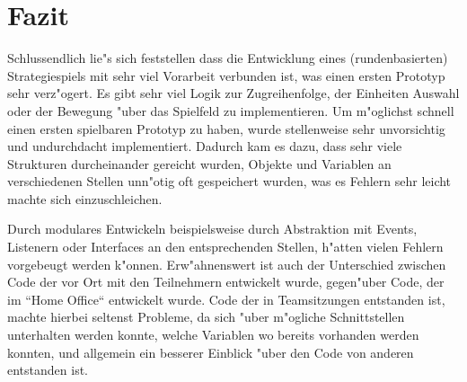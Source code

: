 \chapter{Fazit}
Schlussendlich lie"s sich feststellen dass die Entwicklung eines (rundenbasierten) Strategiespiels mit sehr viel Vorarbeit verbunden ist, was einen ersten Prototyp sehr verz"ogert. Es gibt sehr viel Logik zur Zugreihenfolge, der Einheiten Auswahl oder der Bewegung "uber das Spielfeld zu implementieren. Um m"oglichst schnell einen ersten spielbaren Prototyp zu haben, wurde stellenweise sehr unvorsichtig und undurchdacht implementiert. Dadurch kam es dazu, dass sehr viele Strukturen durcheinander gereicht wurden, Objekte und Variablen an verschiedenen Stellen unn"otig oft gespeichert wurden, was es Fehlern sehr leicht machte sich einzuschleichen.

Durch modulares Entwickeln beispielsweise durch Abstraktion mit Events, Listenern oder Interfaces an den entsprechenden Stellen, h"atten vielen Fehlern vorgebeugt werden k"onnen. Erw"ahnenswert ist auch der Unterschied zwischen Code der vor Ort mit den Teilnehmern entwickelt wurde, gegen"uber Code, der im ``Home Office`` entwickelt wurde. Code der in Teamsitzungen entstanden ist, machte hierbei seltenst Probleme, da sich "uber m"ogliche Schnittstellen unterhalten werden konnte, welche Variablen wo bereits vorhanden werden konnten, und allgemein ein besserer Einblick "uber den Code von anderen entstanden ist.